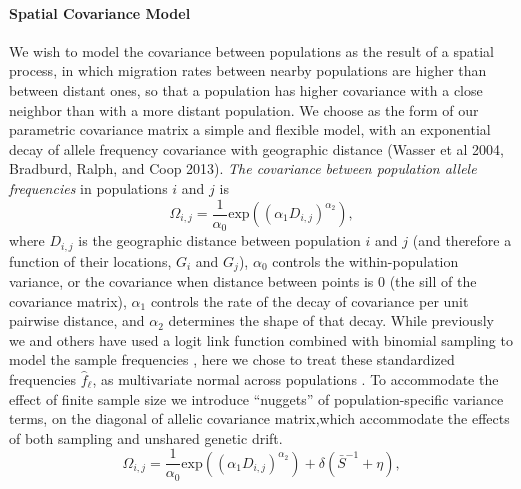 \documentclass[12pt]{article}
\newcommand{\gb}[1]{{\em \color{magenta} #1}}
\newcommand{\gc}[1]{{\em \color{blue} #1}}
\begin{document}
\paragraph{Spatial Covariance Model}
We wish to model the covariance between populations as the result of a spatial process, in which migration rates between nearby populations are higher than between distant ones, so that a population has higher covariance with a close neighbor than with a more distant population.  We choose as the form of our parametric covariance matrix a simple and flexible model, with an exponential decay of allele frequency covariance with geographic distance (Wasser et al 2004, Bradburd, Ralph, and Coop 2013).  \gc{The covariance between population allele frequencies} in populations $i$ and $j$ is 
\begin{equation}
\label{eq:spatial_covariance}
\Omega_{i,j} = \frac{1}{\alpha_0} \text{exp} \left(	\left( \alpha_1D_{i,j} \right)^{\alpha_2} \right) \text{,}
\end{equation}
where $D_{i,j}$ is the geographic distance between population $i$ and $j$ (and therefore a function of their locations, $G_i$ and $G_j$), $\alpha_0$ controls the within-population variance, or the covariance when distance between points is 0 (the sill of the covariance matrix),  $\alpha_1$ controls the rate of the decay of covariance per unit pairwise distance, and $\alpha_2$ determines the shape of that decay. While previously we and others have used a logit link function combined with binomial sampling to model the sample frequencies \citep{Wasser, Bradburd}, here we chose to treat these standardized frequencies $\hat{f}_{\ell}$, as multivariate normal across populations \citep[]{Treemix}. To accommodate the effect of finite sample size we introduce ``nuggets'' of population-specific variance terms, on the diagonal of allelic covariance matrix,which accommodate the effects of both sampling and unshared genetic drift.
\begin{equation}
\label{eq:spatial_covariance2}
\Omega_{i,j} = \frac{1}{\alpha_0} \text{exp} \left(	\left( \alpha_1D_{i,j} \right)^{\alpha_2} \right) + \delta(\bar{S}^{-1} + \eta) \text{,}
\end{equation}
\end{document}
